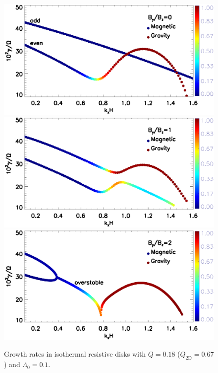 \begin{figure}
  \includegraphics[width=\linewidth,clip=true,trim=0cm 2cm 0cm
    0cm]{figures/compare_growth3_tilted_resis_ep0.ps}  
  \includegraphics[width=\linewidth,clip=true,trim=0cm 2cm 0cm
    0.52cm]{figures/compare_growth3_tilted_resis_ep1.ps}
  \includegraphics[width=\linewidth,clip=true,trim=0cm 0cm 0cm
    0.52cm]{figures/compare_growth3_tilted_resis_ep2.ps}
  \caption{Growth rates in isothermal resistive disks with $Q=0.18$
    ($Q_\mathrm{2D}=0.67$) and $\Lambda_0=0.1$.  
    \label{compare_growth3_tilted_resis}}
\end{figure}




